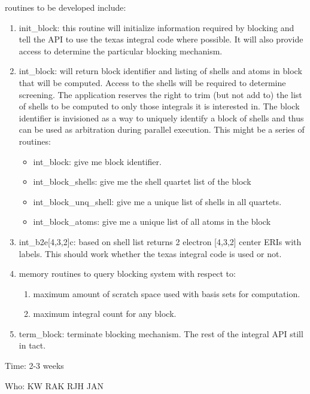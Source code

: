 routines to be developed include:
\begin{enumerate}
\item init\_block: this routine will initialize information required by
blocking and tell the API to use the texas integral code where
possible.  It will also provide access to determine the particular
blocking mechanism. 

\item int\_block: will return block identifier and listing of shells
and atoms in block that will be computed.  Access to the shells will
be required to determine screening.  The application reserves the
right to trim (but not add to) the list of shells to be computed to
only those integrals it is interested in.  The block identifier is
invisioned as a way to uniquely identify a block of shells and thus
can be used as arbitration during parallel execution.  This might be a
series of routines:
\begin{itemize}
\item int\_block: give me block identifier.
\item int\_block\_shells:  give me the shell quartet list of the block
\item int\_block\_unq\_shell: give me a unique list of shells in all
quartets.
\item int\_block\_atoms: give me a unique list of all atoms in the block
\end{itemize}

\item int\_b2e[4,3,2]c: based on shell list returns 2
electron [4,3,2] center ERIs with labels.  This should work whether
the texas integral code is used or not.  

\item memory routines to query blocking system with respect to:
\begin{enumerate}
\item maximum amount of scratch space used with basis sets for computation.
\item maximum integral count for any block.
\end{enumerate}

\item term\_block: terminate blocking mechanism.  The rest of the
integral API still in tact.  

\end{enumerate}

Time: 2-3 weeks

Who:  KW  RAK RJH JAN

